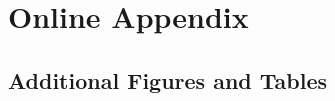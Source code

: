 \documentclass[11pt,a4paper]{article}
\begin{document}



\appendix
\newpage
\pagestyle{fancy}
\fancyhf{} %
\fancyfoot[C]{\thepage} %

	\section{Online Appendix}\label{sec:appendix}
	\setcounter{table}{0}
	\renewcommand{\thetable}{A\arabic{table}}
	\setcounter{figure}{0}
	\renewcommand{\thefigure}{A\arabic{figure}}
	\renewcommand{\thesubsection}{\Alph{subsection}}
		\setcounter{page}{1}
	\renewcommand{\thepage}{A-\arabic{page}}




\subsection{Additional Figures and Tables}
\end{document}
